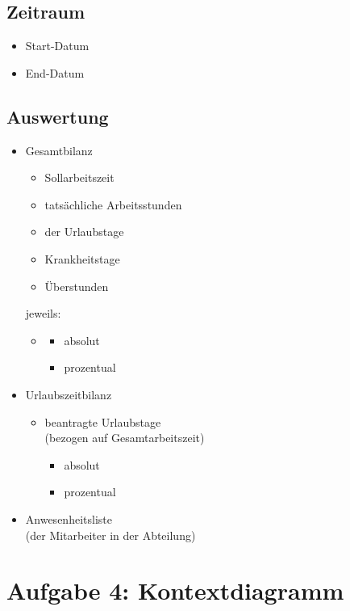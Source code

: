 \section{Zeitraum}
\begin{itemize}
\item Start-Datum
\item End-Datum
\end{itemize}
\section{Auswertung}
\begin{itemize}
\item Gesamtbilanz
\begin{itemize}
\item Sollarbeitszeit
\item tatsächliche Arbeitsstunden
\item der Urlaubstage
\item Krankheitstage
\item Überstunden
\end{itemize}
jeweils: 
\begin{itemize}
\item[]
\begin{itemize}
\item absolut
\item prozentual
\end{itemize}
\end{itemize}
\item Urlaubszeitbilanz
\begin{itemize}
\item beantragte Urlaubstage\\
(bezogen auf Gesamtarbeitszeit)
\begin{itemize}
\item absolut
\item prozentual
\end{itemize}
\end{itemize}
\item Anwesenheitsliste\\
(der Mitarbeiter in der Abteilung)
\end{itemize}

\chapter*{Aufgabe 4: Kontextdiagramm}
\setcounter{section}{0}
\addtocounter{chapter}{1}

